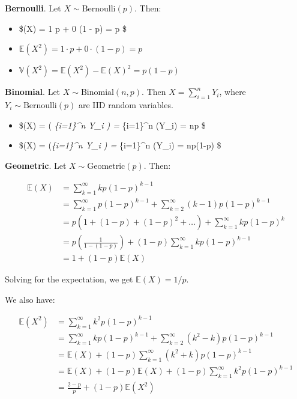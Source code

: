 \textbf{Bernoulli}. Let \(X \sim \text{Bernoulli}(p)\). Then:

\begin{itemize}[tightlist]
\item
  \$(X) = 1 \cdot p + 0 \cdot (1 - p) = p \$
\item
  \(\mathbb{E}(X^2) = 1 \cdot p + 0 \cdot (1 - p) = p\)
\item
  \(\mathbb{V}(X^2) = \mathbb{E}(X^2) - \mathbb{E}(X)^2 = p(1 - p)\)
\end{itemize}

\textbf{Binomial}. Let \(X \sim \text{Binomial}(n, p)\). Then
\(X = \sum_{i=1}^n Y_i\), where \(Y_i \sim \text{Bernoulli}(p)\) are IID
random variables.

\begin{itemize}[tightlist]
\item
  \$(X) = \left( \sum\emph{\{i=1\}\^{}n Y\_i \right)
  = \sum}\{i=1\}\^{}n (Y\_i) = np \$
\item
  \$(X) = \left(\sum\emph{\{i=1\}\^{}n Y\_i \right)
  = \sum}\{i=1\}\^{}n (Y\_i) = np(1-p) \$
\end{itemize}

\textbf{Geometric}. Let \(X \sim \text{Geometric}(p)\). Then:

\begin{align}
\mathbb{E}(X) &= \sum_{k=1}^\infty k p (1 - p)^{k - 1}  \\
&= \sum_{k=1}^\infty p(1-p)^{k-1} + \sum_{k=2}^\infty (k - 1) p(1-p)^{k - 1} \\
&= p \left( 1 + (1 - p) + (1 - p)^2 + \dots \right) + \sum_{k=1}^\infty k p(1-p)^k \\
&= p \left(\frac{1}{1 - (1 - p)}\right) + (1 - p) \sum_{k=1}^\infty k p(1-p)^{k - 1} \\
&= 1 + (1 - p) \mathbb{E}(X)
\end{align}

Solving for the expectation, we get \(\mathbb{E}(X) = 1/p\).

We also have:

\begin{align}
\mathbb{E}(X^2) &= \sum_{k=1}^\infty k^2 p (1 - p)^{k - 1}  \\
&= \sum_{k=1}^\infty k p(1-p)^{k-1} + \sum_{k=2}^\infty (k^2 - k) p(1-p)^{k - 1} \\
&= \mathbb{E}(X) + (1 - p) \sum_{k=1}^\infty (k^2 + k) p(1-p)^{k - 1} \\
&= \mathbb{E}(X) + (1 - p) \mathbb{E}(X) + (1 - p) \sum_{k=1}^\infty k^2 p(1-p)^{k-1} \\
&= \frac{2 - p}{p} + (1 - p) \mathbb{E}(X^2)
\end{align}

